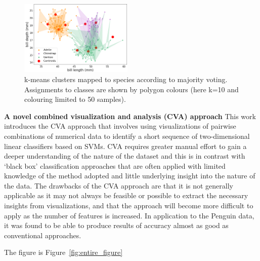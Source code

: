 \documentclass[12pt]{article}
\begin{document}
\begin{figure} %
  \centering
  \vspace{-0.5\baselineskip} %
  \includegraphics[width=0.48\textwidth]{kmeansmap.png} %
  \vspace{-0.5\baselineskip} %
  \caption{k-means clusters mapped to species according to majority voting. Assignments to classes are shown by polygon colours (here k=10 and colouring limited to 50 samples).}
  \vspace{-0.5\baselineskip} %
  \label{fig:kmeansmap}
\end{figure}

\textbf{A novel combined visualization and analysis (CVA) approach}  
This work introduces the CVA approach that involves using visualizations of pairwise combinations of numerical data 
to identify a short sequence of two-dimensional linear classifiers based on SVMs. 
CVA requires greater manual effort to gain a deeper understanding of the nature of the dataset 
and this is in contrast with `black box' classification approaches that are often applied with limited knowledge 
of the method adopted and little underlying insight into the nature of the data. 
The drawbacks of the CVA approach are that it is not generally applicable as it may not always be feasible 
or possible to extract the necessary insights from visualizations, 
and that the approach will become more difficult to apply as the number of features is increased. 
In application to the Penguin data, it was found to be able to produce results of accuracy almost as good as conventional approaches.

The figure is Figure~\ref{fig:entire_figure}
\end{document}
